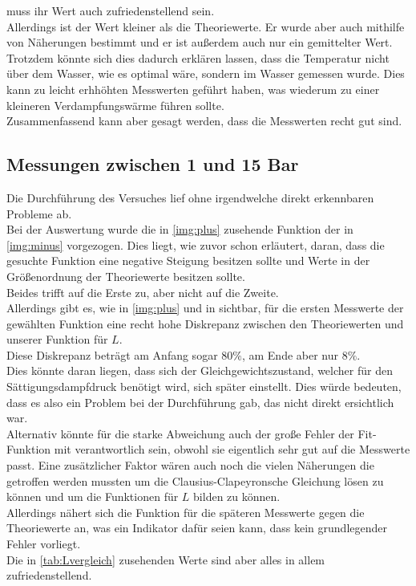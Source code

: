 muss ihr Wert auch zufriedenstellend sein.\\ 
Allerdings ist der Wert kleiner als die Theoriewerte.
Er wurde aber auch mithilfe von Näherungen bestimmt und er ist außerdem auch nur ein gemittelter Wert.
Trotzdem könnte sich dies dadurch erklären lassen, dass die Temperatur nicht über dem Wasser, wie es optimal wäre, sondern im Wasser gemessen wurde.
Dies kann zu leicht erhhöhten Messwerten geführt haben, was wiederum zu einer kleineren Verdampfungswärme führen sollte.\\
Zusammenfassend kann aber gesagt werden, dass die Messwerten recht gut sind.



\subsection{Messungen zwischen 1 und 15 Bar}

Die Durchführung des Versuches lief ohne irgendwelche direkt erkennbaren Probleme ab.\\
Bei der Auswertung wurde die in \ref{img:plus} zusehende Funktion der in \ref{img:minus} vorgezogen.
Dies liegt, wie zuvor schon erläutert, daran, dass die gesuchte Funktion eine negative Steigung besitzen sollte und Werte in der Größenordnung der Theoriewerte besitzen sollte.\\
Beides trifft auf die Erste zu, aber nicht auf die Zweite.\\
Allerdings gibt es, wie in \ref{img:plus} und in   sichtbar, für die ersten Messwerte der gewählten Funktion eine recht hohe Diskrepanz zwischen den Theoriewerten und unserer Funktion für $L$.\\
Diese Diskrepanz beträgt am Anfang sogar $80 \si{\percent}$, am Ende aber nur $ 8\si{\percent}$.\\
Dies könnte daran liegen, dass sich der Gleichgewichtszustand, welcher für den Sättigungsdampfdruck benötigt wird, sich später einstellt.
Dies würde bedeuten, dass es also ein Problem bei der Durchführung gab, das nicht direkt ersichtlich war.\\
Alternativ könnte für die starke Abweichung auch der große Fehler der Fit-Funktion mit verantwortlich sein, obwohl sie eigentlich sehr gut auf 
die Messwerte passt. Eine zusätzlicher Faktor wären auch noch die vielen Näherungen die getroffen werden mussten um die Clausius-Clapeyronsche Gleichung lösen zu können
und um die Funktionen für $L$ bilden zu können.\\
Allerdings nähert sich die Funktion für die späteren Messwerte gegen die Theoriewerte an, was ein Indikator dafür seien kann, dass kein grundlegender Fehler vorliegt.\\
Die in \ref{tab:Lvergleich} zusehenden Werte sind aber alles in allem zufriedenstellend.

